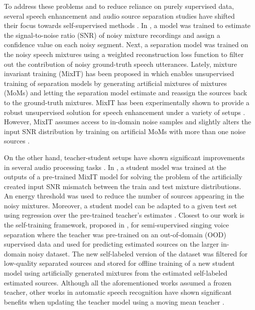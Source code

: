 \documentclass{article}
\begin{document}
To address these problems and to reduce reliance on purely supervised data, several speech enhancement and audio source separation studies have shifted their focus towards self-supervised methods \cite{xia2021incorporating}. 
In \cite{sivaraman2021personalizedSE_SSL_dataPurification}, a model was trained to estimate the signal-to-noise ratio (SNR) of noisy mixture recordings and assign a confidence value on each noisy segment. Next, a separation model was trained on the noisy speech mixtures using a weighted reconstruction loss function to filter out the contribution of noisy ground-truth speech utterances.
Lately, mixture invariant training (MixIT) has been proposed in \cite{mixit} which enables unsupervised training of separation models by generating artificial mixtures of mixtures (MoMs) and letting the separation model estimate and reassign the sources back to the ground-truth mixtures. MixIT has been experimentally shown to provide a robust unsupervised solution for speech enhancement under a variety of setups \cite{mixit,fujimura2021noisyTargetTRaining,tzinis2021separate}. However, MixIT assumes access to in-domain noise samples and slightly alters the input SNR distribution by training on artificial MoMs with more than one noise sources \cite{saito2021trainingSEsystemsWNoisyDatasets}.

On the other hand, teacher-student setups have shown significant improvements in several audio processing tasks \cite{aihara2019teacherStudentDeepClustering}. In \cite{zhang2021teacher}, a student model was trained at the outputs of a pre-trained MixIT model for solving the problem of the artificially created input SNR mismatch between the train and test mixture distributions. An energy threshold was used to reduce the number of sources appearing in the noisy mixtures. Moreover, a student model can be adapted to a given test set using regression over the pre-trained teacher's estimates \cite{zeroshot_testTimeAdaptationSE}. Closest to our work is the self-training framework, proposed in \cite{wang2021semiSupSingVoiceSepNoisySelfTraining}, for semi-supervised singing voice separation where the teacher was pre-trained on an out-of-domain (OOD) supervised data and used for predicting estimated sources on the larger in-domain noisy dataset. The new self-labeled version of the dataset was filtered for low-quality separated sources and stored for offline training of a new student model using artificially generated mixtures from the estimated self-labeled estimated sources. Although all the aforementioned works assumed a frozen teacher, other works in automatic speech recognition have shown significant benefits when updating the teacher model using a moving mean teacher \cite{higuchi2021momentumPseudoLabelingforASR}.
\end{document}
